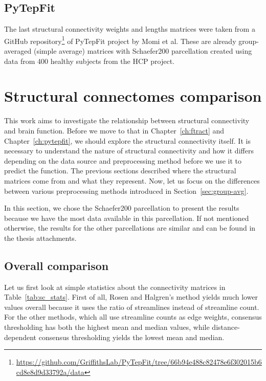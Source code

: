\subsection{PyTepFit}

The last structural connectivity weights and lengths matrices were taken from a GitHub repository\footnote{\url{https://github.com/GriffithsLab/PyTepFit/tree/66b94e488c82478e6f302015b6cd8e8d9d33792a/data}} of PyTepFit project by Momi et al\cite{momi_tms-evoked_2023}. These are already group-averaged (simple average) matrices with Schaefer200 parcellation created using data from 400 healthy subjects from the HCP project. 

\section{Structural connectomes comparison}

This work aims to investigate the relationship between structural connectivity and brain function. Before we move to that in Chapter~\ref{ch:ftract} and Chapter~\ref{ch:pytepfit}, we should explore the structural connectivity itself. It is necessary to understand the nature of structural connectivity and how it differs depending on the data source and preprocessing method before we use it to predict the function. The previous sections described where the structural matrices come from and what they represent. Now, let us focus on the differences between various preprocessing methods introduced in Section~\ref{sec:group-avg}.

In this section, we chose the Schaefer200 parcellation to present the results because we have the most data available in this parcellation. If not mentioned otherwise, the results for the other parcellations are similar and can be found in the thesis attachments. \TODO

\subsection{Overall comparison}

Let us first look at simple statistics about the connectivity matrices in Table~\ref{tab:sc_stats}. First of all, Rosen and Halgren's method yields much lower values overall because it uses the ratio of streamlines instead of streamline count. For the other methods, which all use streamline counts as edge weights, consensus thresholding has both the highest mean and median values, while distance-dependent consensus thresholding yields the lowest mean and median.

